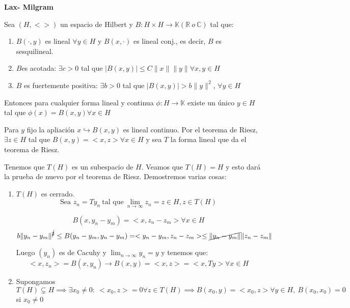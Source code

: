 \documentclass[openany]{book}
\begin{document}
\begin{theorem}\textbf{Lax- Milgram}


    Sea $ (H,<>) $ un espacio de Hilbert y $ B: H \times H \to \mathbb{K} (\mathbb{R}\ o\ \mathbb{C}) $ tal que:

    \begin{enumerate}
        \item $ B(\cdot ,y) $ es lineal $ \forall y \in H $ y $ B(x,\cdot ) $ es lineal conj., es decir, $ B $ es sesquilineal.
        \item $ B $es acotada: $ \exists c > 0 $ tal que $ |B(x,y)| \leq  C \|x\|\|y\| \forall x,y \in H $
        \item $ B $ es fuertemente positiva: $ \exists b > 0 $ tal que $ |B(x,y)| > b\|y\|^2 $, $ \forall  y \in H $
    \end{enumerate}

    Entonces para cualquier forma lineal y continua $ \phi: H \to \mathbb{K} $ existe un único $ y \in H $ tal que $ \phi(x) = B(x,y)  \forall x \in H$
\end{theorem}



\begin{demonstration}
    
    Para $ y  $ fijo la apliación $ x \hookrightarrow B(x,y) $ es lineal continuo. Por el teorema de Riesz, $ \exists z \in H $ tal que $ B(x,y) = <x,z> \forall x \in H $ y sea $ T $ la forma lineal que da el teorema de Riesz. 

    Tenemos que $ T(H) $ es un subespacio de $ H $. Veamos que $ T(H) = H $ y esto dará la prueba de nuevo por el teorema de Riesz. Demostremos varias cosas:

    \begin{enumerate}
        \item $ T(H) $ es cerrado.
            $$\text{Sea } z_n = Ty_n\ \text{tal que}\ \lim_{n \to \infty} z_n = z \in H, z \in T(H) $$

            $$ B(x,y_n-y_m) = <x,z_n-z_m> \forall x \in H $$
            $$ b\|y_n-y_m\|^{\cancel{2}} \leq  B(y_n-y_m,y_n-y_m) = <y_n-y_m,z_n-z_m>\leq \cancel{ \|y_n-y_m\|} \|z_n -z_m\| $$

            Luego $ (y_n) $ es de Cacuhy y $ \lim_{n \to \infty}y_n = y $ y tenemos que:
            $$ <x,z_n>  = B(x,y_n) \to B(x,y) = <x,z> = <x,Ty> \forall x \in H $$

        \item Supongamos $ T(H) \subsetneq H \implies \exists x_0 \ne 0:\ <x_0,z> = 0 \forall z \in T(H) \implies B(x_0,y) = <x_0,z> \forall y \in H,\ B(x_0,x_0) = 0 $ si $ x_0 \ne 0 $
    \end{enumerate}

    
\end{demonstration}
\end{document}
